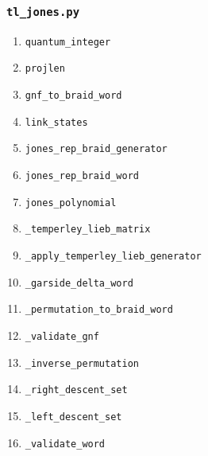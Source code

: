 ﻿\documentclass[10pt]{article}
\begin{document}
\subsubsection*{\texttt{tl\_jones.py}}
\begin{enumerate}
  \item \texttt{quantum\_integer}
  \item \texttt{projlen}
  \item \texttt{gnf\_to\_braid\_word}
  \item \texttt{link\_states}
  \item \texttt{jones\_rep\_braid\_generator}
  \item \texttt{jones\_rep\_braid\_word}
  \item \texttt{jones\_polynomial}
  \item \texttt{\_temperley\_lieb\_matrix}
  \item \texttt{\_apply\_temperley\_lieb\_generator}
  \item \texttt{\_garside\_delta\_word}
  \item \texttt{\_permutation\_to\_braid\_word}
  \item \texttt{\_validate\_gnf}
  \item \texttt{\_inverse\_permutation}
  \item \texttt{\_right\_descent\_set}
  \item \texttt{\_left\_descent\_set}
  \item \texttt{\_validate\_word}
\end{enumerate}
\end{document}
